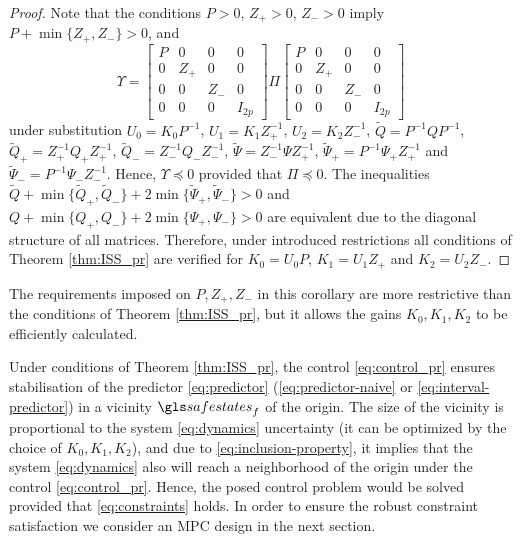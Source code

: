 \begin{proof}
	Note that the conditions $P>0$, $Z_{+}>0$, $Z_{-}>0$ imply $P+\min\{Z_{+},Z_{-}\}>0$,
	and 
	\[
	\Upsilon=\left[\begin{array}{cccc}
	P & 0 & 0 & 0\\
	0 & Z_{+} & 0 & 0\\
	0 & 0 & Z_{-} & 0\\
	0 & 0 & 0 & I_{2p}
	\end{array}\right]\Pi\left[\begin{array}{cccc}
	P & 0 & 0 & 0\\
	0 & Z_{+} & 0 & 0\\
	0 & 0 & Z_{-} & 0\\
	0 & 0 & 0 & I_{2p}
	\end{array}\right]
	\]
	under substitution $U_{0}=K_{0}P^{-1}$, $U_{1}=K_{1}Z_{+}^{-1}$,
	$U_{2}=K_{2}Z_{-}^{-1}$, $\tilde{Q}=P^{-1}QP^{-1}$, $\tilde{Q}_{+}=Z_{+}^{-1}Q_{+}Z_{+}^{-1}$,
	$\tilde{Q}_{-}=Z_{-}^{-1}Q_{-}Z_{-}^{-1}$, $\tilde{\Psi}=Z_{-}^{-1}\Psi Z_{+}^{-1}$,
	$\tilde{\Psi}_{+}=P^{-1}\Psi_{+}Z_{+}^{-1}$ and $\tilde{\Psi}_{-}=P^{-1}\Psi_{-}Z_{-}^{-1}$.
	Hence, $\Upsilon\preceq0$ provided that $\Pi\preceq0$. The inequalities
	$\tilde{Q}+\min\{\tilde{Q}_{+},\tilde{Q}_{-}\}+2\min\{\tilde{\Psi}_{+},\tilde{\Psi}_{-}\}>0$
	and $Q+\min\{Q_{+},Q_{-}\}+2\min\{\Psi_{+},\Psi_{-}\}>0$ are equivalent
	due to the diagonal structure of all matrices. Therefore, under introduced
	restrictions all conditions of Theorem \ref{thm:ISS_pr} are verified
	for $K_{0}=U_{0}P$, $K_{1}=U_{1}Z_{+}$ and $K_{2}=U_{2}Z_{-}$.
\end{proof}
The requirements imposed on $P,Z_{+},Z_{-}$ in this corollary are
more restrictive than the conditions of Theorem \ref{thm:ISS_pr},
but it allows the gains $K_{0},K_{1},K_{2}$ to be efficiently calculated.

Under conditions of Theorem \ref{thm:ISS_pr}, the control \eqref{eq:control_pr} ensures stabilisation of the predictor \eqref{eq:predictor} (\ie \eqref{eq:predictor-naive} or \eqref{eq:interval-predictor}) in a vicinity $\safestates_{f}$ of the origin. The size of the vicinity is proportional to the system \eqref{eq:dynamics} uncertainty (it can be optimized by the choice of $K_{0},K_{1},K_{2}$), and due to \eqref{eq:inclusion-property}, it implies that the system \eqref{eq:dynamics} also will reach a neighborhood of the origin under the control \eqref{eq:control_pr}. Hence, the posed control problem would be solved provided that \eqref{eq:constraints} holds. In order to ensure the robust constraint satisfaction we consider an \gls{MPC} design in the next section.

